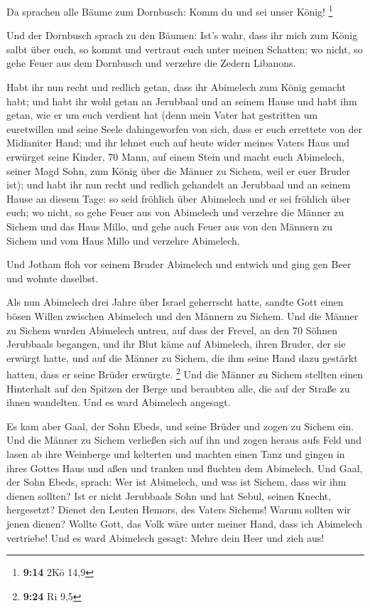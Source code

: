  Da sprachen alle Bäume zum Dornbusch: Komm du und sei
unser König! \footnote{\textbf{9:14} 2Kö 14,9}

 Und der Dornbusch sprach zu den Bäumen: Ist's wahr, dass
ihr mich zum König salbt über euch, so kommt und vertraut euch unter
meinen Schatten; wo nicht, so gehe Feuer aus dem Dornbusch und verzehre
die Zedern Libanons.

 Habt ihr nun recht und redlich getan, dass ihr Abimelech
zum König gemacht habt; und habt ihr wohl getan an Jerubbaal und an
seinem Hause und habt ihm getan, wie er um euch verdient hat
 (denn mein Vater hat gestritten um euretwillen und seine
Seele dahingeworfen von sich, dass er euch errettete von der Midianiter
Hand;  und ihr lehnet euch auf heute wider meines Vaters
Haus und erwürget seine Kinder, 70 Mann, auf einem Stein und macht euch
Abimelech, seiner Magd Sohn, zum König über die Männer zu Sichem, weil
er euer Bruder ist);  und habt ihr nun recht und redlich
gehandelt an Jerubbaal und an seinem Hause an diesem Tage: so seid
fröhlich über Abimelech und er sei fröhlich über euch; 
wo nicht, so gehe Feuer aus von Abimelech und verzehre die Männer zu
Sichem und das Haus Millo, und gehe auch Feuer aus von den Männern zu
Sichem und vom Haus Millo und verzehre Abimelech.

 Und Jotham floh vor seinem Bruder Abimelech und entwich
und ging gen Beer und wohnte daselbst.

 Als nun Abimelech drei Jahre über Israel geherrscht
hatte,  sandte Gott einen bösen Willen zwischen Abimelech
und den Männern zu Sichem. Und die Männer zu Sichem wurden Abimelech
untreu,  auf dass der Frevel, an den 70 Söhnen Jerubbaals
begangen, und ihr Blut käme auf Abimelech, ihren Bruder, der sie erwürgt
hatte, und auf die Männer zu Sichem, die ihm seine Hand dazu gestärkt
hatten, dass er seine Brüder erwürgte. \footnote{\textbf{9:24} Ri 9,5}
 Und die Männer zu Sichem stellten einen Hinterhalt auf
den Spitzen der Berge und beraubten alle, die auf der Straße zu ihnen
wandelten. Und es ward Abimelech angesagt.

 Es kam aber Gaal, der Sohn Ebeds, und seine Brüder und
zogen zu Sichem ein. Und die Männer zu Sichem verließen sich auf ihn
 und zogen heraus aufs Feld und lasen ab ihre Weinberge
und kelterten und machten einen Tanz und gingen in ihres Gottes Haus und
aßen und tranken und fluchten dem Abimelech.  Und Gaal,
der Sohn Ebeds, sprach: Wer ist Abimelech, und was ist Sichem, dass wir
ihm dienen sollten? Ist er nicht Jerubbaals Sohn und hat Sebul, seinen
Knecht, hergesetzt? Dienet den Leuten Hemors, des Vaters Sichems! Warum
sollten wir jenen dienen?  Wollte Gott, das Volk wäre
unter meiner Hand, dass ich Abimelech vertriebe! Und es ward Abimelech
gesagt: Mehre dein Heer und zieh aus!

